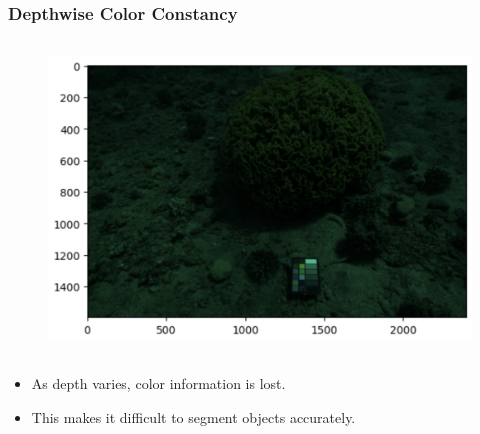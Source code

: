 \begin{frame}
    \frametitle{Depthwise Color Constancy}
    \begin{columns}
        \begin{column}{0.5\textwidth}
            \begin{figure}
                \includegraphics[width=\linewidth]{images/depth_color_issue.png}
            \end{figure}
        \end{column}    
    \end{columns}
    \begin{itemize}
        \item As depth varies, color information is lost.
        \item This makes it difficult to segment objects accurately.
        
    \end{itemize}
\end{frame}

